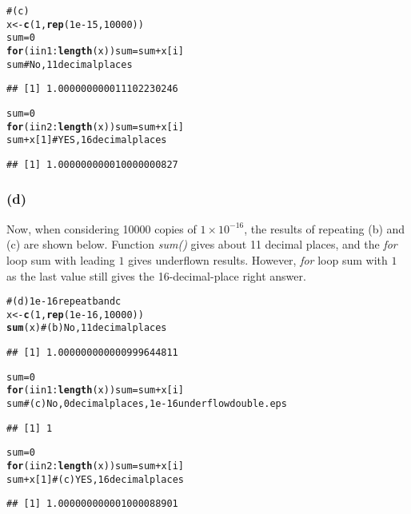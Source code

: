 \documentclass{article}\usepackage{graphicx, color}
\makeatletter
\newcommand{\hlfunctioncall}[1]{\textcolor[rgb]{0.501960784313725,0,0.329411764705882}{\textbf{#1}}}%
\newcommand{\hlcomment}[1]{\textcolor[rgb]{0.180392156862745,0.6,0.341176470588235}{#1}}%
\newenvironment{kframe}{%
 \def\at@end@of@kframe{}%
 \ifinner\ifhmode%
  \def\at@end@of@kframe{\end{minipage}}%
  \begin{minipage}{\columnwidth}%
 \fi\fi%
 \def\FrameCommand##1{\hskip\@totalleftmargin \hskip-\fboxsep
 \colorbox{shadecolor}{##1}\hskip-\fboxsep
     \hskip-\linewidth \hskip-\@totalleftmargin \hskip\columnwidth}%
 \MakeFramed {\advance\hsize-\width
   \@totalleftmargin\z@ \linewidth\hsize
   \@setminipage}}%
 {\par\unskip\endMakeFramed%
 \at@end@of@kframe}
\newenvironment{knitrout}{}{} %
\makeatother
\begin{document}
\begin{knitrout}
\color{fgcolor}\begin{kframe}
\begin{alltt}
\hlcomment{# (c)}
x <- \hlfunctioncall{c}(1, \hlfunctioncall{rep}(1e-15, 10000))
sum = 0
\hlfunctioncall{for} (i in 1:\hlfunctioncall{length}(x)) sum = sum + x[i]
sum  \hlcomment{# No, 11 decimal places}
\end{alltt}
\begin{verbatim}
## [1] 1.000000000011102230246
\end{verbatim}
\begin{alltt}

sum = 0
\hlfunctioncall{for} (i in 2:\hlfunctioncall{length}(x)) sum = sum + x[i]
sum + x[1]  \hlcomment{# YES, 16 decimal places}
\end{alltt}
\begin{verbatim}
## [1] 1.000000000010000000827
\end{verbatim}
\end{kframe}
\end{knitrout}


\subsubsection*{(d)}
Now, when considering 10000 copies of $1 \times 10^{-16}$, the results of repeating (b) and (c) are shown below.
Function \textit{sum()} gives about 11 decimal places, and the \textit{for} loop sum with leading $1$ gives underflown results.
However, \textit{for} loop sum with $1$ as the last value still gives the 16-decimal-place right answer.

\begin{knitrout}
\color{fgcolor}\begin{kframe}
\begin{alltt}
\hlcomment{# (d) 1e-16 repeat b and c}
x <- \hlfunctioncall{c}(1, \hlfunctioncall{rep}(1e-16, 10000))
\hlfunctioncall{sum}(x)  \hlcomment{# (b) No, 11 decimal places}
\end{alltt}
\begin{verbatim}
## [1] 1.000000000000999644811
\end{verbatim}
\begin{alltt}

sum = 0
\hlfunctioncall{for} (i in 1:\hlfunctioncall{length}(x)) sum = sum + x[i]
sum  \hlcomment{# (c) No, 0 decimal places, 1e-16 underflow double.eps}
\end{alltt}
\begin{verbatim}
## [1] 1
\end{verbatim}
\begin{alltt}

sum = 0
\hlfunctioncall{for} (i in 2:\hlfunctioncall{length}(x)) sum = sum + x[i]
sum + x[1]  \hlcomment{# (c) YES, 16 decimal places}
\end{alltt}
\begin{verbatim}
## [1] 1.000000000001000088901
\end{verbatim}
\end{kframe}
\end{knitrout}
\end{document}
